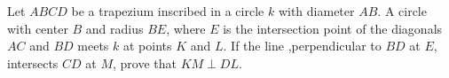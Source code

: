 Let $ABCD$ be a trapezium inscribed in a circle $k$ with diameter $AB$. A circle with center $B$ and radius $BE$, where $E$ is the intersection point of the diagonals $AC$ and $BD$ meets $k$ at points $K$ and $L$. If the line ,perpendicular to $BD$ at $E$, intersects $CD$ at $M$, prove that $KM\perp DL$.